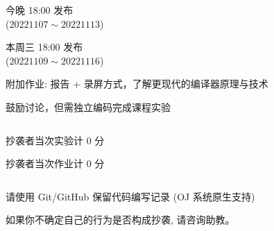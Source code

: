 \begin{frame}{}
  \begin{center}
      今晚 18:00 发布 \\[5pt]
    ($20221107 \sim 20221113$)

    \vspace{0.10cm}

    \pause
    \vspace{0.10cm}
      本周三 18:00 发布 \\[5pt]
    ($20221109 \sim 20221116$)
  \end{center}
\end{frame}

\begin{frame}{}
  \begin{center}
    附加作业: 报告 + 录屏方式，了解更现代的编译器原理与技术 \\[6pt]

  \end{center}
\end{frame}

\begin{frame}
  \begin{center}
    鼓励讨论，但需独立编码完成课程实验
  \end{center}

  \pause
  \begin{columns}
    \begin{description}
      \setlength{\itemsep}{6pt}
      \item[课程实验:] 抄袭者当次实验计 $0$ 分
      \item[附加作业:] 抄袭者当次作业计 $0$ 分
    \end{description}
  \end{columns}
\end{frame}

\begin{frame}
  \begin{center}
    请使用 Git/GitHub 保留代码编写记录 (OJ 系统原生支持)

    \vspace{0.50cm}
    如果你不确定自己的行为是否构成抄袭, 请咨询助教。
  \end{center}
\end{frame}

